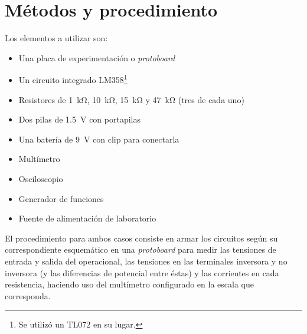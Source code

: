 \section{Métodos y procedimiento}

Los elementos a utilizar son:

\begin{itemize}
    \item Una placa de experimentación o \textit{protoboard}
    \item Un circuito integrado LM358\footnote{Se utilizó un TL072 en su lugar.}
    \item Resistores de \SI{1}{\kilo\ohm}, \SI{10}{\kilo\ohm}, \SI{15}{\kilo\ohm} y \SI{47}{\kilo\ohm} (tres de cada uno)
    \item Dos pilas de \SI{1.5}{\volt} con portapilas
    \item Una batería de \SI{9}{\volt} con clip para conectarla
    \item Multímetro
    \item Osciloscopio
    \item Generador de funciones
    \item Fuente de alimentación de laboratorio
\end{itemize}

El procedimiento para ambos casos consiste en armar los circuitos según su correspondiente esquemático en una \textit{protoboard} para medir las tensiones de entrada y salida del operacional, las tensiones en las terminales inversora y no inversora (y las diferencias de potencial entre éstas) y las corrientes en cada resistencia, haciendo uso del multímetro configurado en la escala que corresponda.
